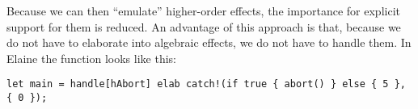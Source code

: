 Because we can then ``emulate'' higher-order effects, the importance for explicit support for them is reduced. An advantage of this approach is that, because we do not have to elaborate into algebraic effects, we do not have to handle them. In Elaine the  function looks like this:

\begin{lstlisting}[language=elaine,style=fancy]
let main = handle[hAbort] elab catch!(if true { abort() } else { 5 }, { 0 });
\end{lstlisting}


